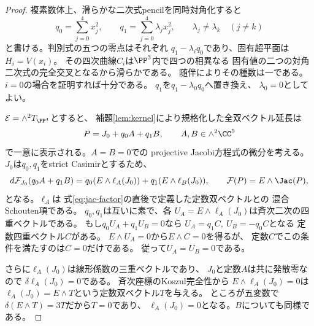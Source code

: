 \begin{proof}
複素数体上、滑らかな二次式pencilを同時対角化すると
\[
 q_0=\sum_{j=0}^4x_j^2,\qquad
 q_1=\sum_{j=0}^4\lambda_jx_j^2,\qquad
 \lambda_j\ne\lambda_k\quad(j\ne k)
\]
と書ける。判別式の五つの零点はそれぞれ
$q_1-\lambda_iq_0$であり、固有超平面は$H_i=V(x_i)$。
その四次曲線$C_i$は$\PP^3$内で四つの相異なる
固有値の二つの対角二次式の完全交叉となるから滑らかである。
随伴によりその種数は一である。
$i=0$の場合を証明すれば十分である。
$q_1$を$q_1-\lambda_0q_0$へ置き換え、
$\lambda_0=0$としてよい。

$\mathcal E=\wedge^2T_{\PP^4}$とすると、
補題\ref{lem:kernel}により規格化した全双ベクトル延長は
\[
 P=J_0+q_0A+q_1B,\qquad
 A,B\in\wedge^2\CC^5
\]
で一意に表示される。$A=B=0$での
projective Jacobi方程式の微分を考える。
$J_0$は$q_0,q_1$をstrict Casimirとするため、
\[
 d\mathcal F_{J_0}(q_0A+q_1B)
 =q_0(E\wedge\ell_A(J_0))+
  q_1(E\wedge\ell_B(J_0)),
 \qquad \mathcal F(P)=E\wedge\Jac(P),
\]
となる。$\ell_A$は
式\eqref{eq:jac-factor}の直後で定義した定数双ベクトルとの
混合Schouten項である。
$q_0,q_1$は互いに素で、各
$U_A=E\wedge\ell_A(J_0)$は斉次二次の四重ベクトルである。
もし$q_0U_A+q_1U_B=0$なら
$U_A=q_1C,\ U_B=-q_0C$となる
定数四重ベクトル$C$がある。
$E\wedge U_A=0$から$E\wedge C=0$を得るが、
定数$C$でこの条件を満たすのは$C=0$だけである。
従って$U_A=U_B=0$である。

さらに$\ell_A(J_0)$は線形係数の三重ベクトルであり、
$J_0$と定数$A$は共に発散零なので
$\delta\ell_A(J_0)=0$である。
斉次座標のKoszul完全性から
$E\wedge\ell_A(J_0)=0$は
$\ell_A(J_0)=E\wedge T$という定数双ベクトル$T$を与える。
ところが五変数で
$\delta(E\wedge T)=3T$だから$T=0$であり、
$\ell_A(J_0)=0$となる。$B$についても同様である。


\end{proof}
